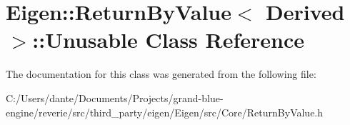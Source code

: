 \hypertarget{class_eigen_1_1_return_by_value_1_1_unusable}{}\section{Eigen\+::Return\+By\+Value$<$ Derived $>$\+::Unusable Class Reference}
\label{class_eigen_1_1_return_by_value_1_1_unusable}


The documentation for this class was generated from the following file\+:\begin{DoxyCompactItemize}
\item 
C\+:/\+Users/dante/\+Documents/\+Projects/grand-\/blue-\/engine/reverie/src/third\+\_\+party/eigen/\+Eigen/src/\+Core/Return\+By\+Value.\+h\end{DoxyCompactItemize}
